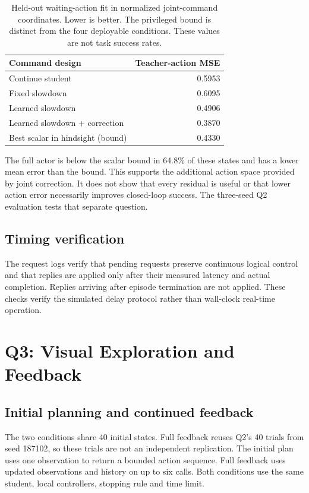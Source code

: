 \begin{table}[h]
\centering\small
\begin{tabular}{lr}
\toprule
Command design & Teacher-action MSE\\
\midrule
Continue student & 0.5953\\
Fixed slowdown & 0.6095\\
Learned slowdown & 0.4906\\
Learned slowdown + correction & 0.3870\\
\midrule
Best scalar in hindsight (bound) & 0.4330\\
\bottomrule
\end{tabular}
\caption{Held-out waiting-action fit in normalized joint-command coordinates. Lower is better. The privileged bound is distinct from the four deployable conditions. These values are not task success rates.}
\label{tab:action_space}
\end{table}
The full actor is below the scalar bound in 64.8\% of these states and has a lower mean error than the bound. This supports the additional action space provided by joint correction. It does not show that every residual is useful or that lower action error necessarily improves closed-loop success. The three-seed Q2 evaluation tests that separate question.





\subsection{Timing verification}
The request logs verify that pending requests preserve continuous logical control and that replies are applied only after their measured latency and actual completion. Replies arriving after episode termination are not applied. These checks verify the simulated delay protocol rather than wall-clock real-time operation.

\section{Q3: Visual Exploration and Feedback}
\subsection{Initial planning and continued feedback}
\label{sec:feedback-protocol}
The two conditions share 40 initial states. Full feedback reuses Q2's 40 trials from seed 187102, so these trials are not an independent replication. The initial plan uses one observation to return a bounded action sequence. Full feedback uses updated observations and history on up to six calls. Both conditions use the same student, local controllers, stopping rule and time limit.

